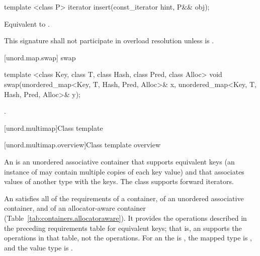 %
%
\begin{itemdecl}
template <class P>
  iterator insert(const_iterator hint, P&& obj);
\end{itemdecl}

\begin{itemdescr}
\pnum
\effects Equivalent to 
.

\pnum
\remarks This signature shall not participate in overload resolution
unless  is .
\end{itemdescr}

[unord.map.swap]{ swap}

%
%
\begin{itemdecl}
template <class Key, class T, class Hash, class Pred, class Alloc>
  void swap(unordered_map<Key, T, Hash, Pred, Alloc>& x,
            unordered_map<Key, T, Hash, Pred, Alloc>& y);
\end{itemdecl}

\begin{itemdescr}
\pnum\effects {}.
\end{itemdescr}

[unord.multimap]{Class template }%

[unord.multimap.overview]{Class template  overview}

\pnum
{}%
%
An  is an unordered associative container
that supports equivalent keys (an instance of  may contain
multiple copies of each key value) and that associates values of
another type  with the keys.
The  class
supports forward iterators.

\pnum
An  satisfies all of the requirements of a container, of an
unordered associative container, and of an allocator-aware container
(Table~\ref{tab:containers.allocatoraware}). It provides the operations described in the
preceding requirements table for equivalent keys; that is, an 
supports the  operations in that table, not the  operations.
For an  the  is , the
mapped type is , and the value type is .

